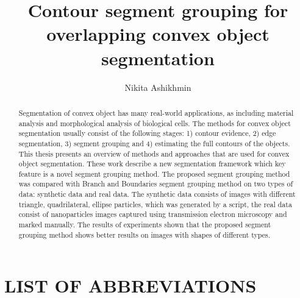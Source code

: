 \documentclass{lutmscthesis}[2010/09/22]
\title{Contour segment grouping for overlapping convex object segmentation}
\author{Nikita Ashikhmin}
\begin{document}

\maketitle
\newpage

\begin{abstract}
Segmentation of convex object has many real-world applications, as including material analysis and morphological analysis of biological cells. The methods for convex object segmentation usually consist of the following stages: 1) contour evidence, 2) edge segmentation, 3) segment grouping and 4) estimating the full contours of the objects. 
This thesis presents an overview of methods and approaches that are used for convex object segmentation. These work describe a new segmentation framework which key feature is a novel segment grouping method. The proposed segment grouping method was compared with Branch and Boundaries segment grouping method on two types of data: synthetic data and real data. The synthetic data consists of images with different triangle, quadrilateral, ellipse particles, which was generated by a script, the real data consist of nanoparticles images captured using transmission electron microscopy and marked manually. The results of experiments shown that the proposed segment grouping method shows better results on images with shapes of different types. 
\end{abstract}




\renewcommand\refname{REFERENCES}
\renewcommand\contentsname{CONTENTS}

\pagestyle{masters}
\newpage



\tableofcontents



\section*{LIST OF ABBREVIATIONS}
\end{document}
